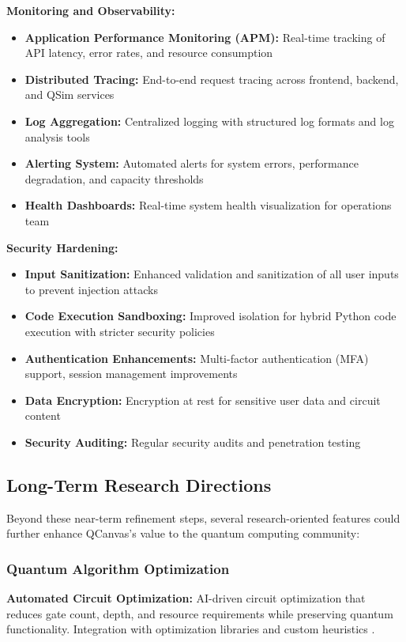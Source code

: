 \textbf{Monitoring and Observability:}
\begin{itemize}
    \item \textbf{Application Performance Monitoring (APM):} Real-time tracking of API latency, error rates, and resource consumption
    \item \textbf{Distributed Tracing:} End-to-end request tracing across frontend, backend, and QSim services
    \item \textbf{Log Aggregation:} Centralized logging with structured log formats and log analysis tools
    \item \textbf{Alerting System:} Automated alerts for system errors, performance degradation, and capacity thresholds
    \item \textbf{Health Dashboards:} Real-time system health visualization for operations team
\end{itemize}

\textbf{Security Hardening:}
\begin{itemize}
    \item \textbf{Input Sanitization:} Enhanced validation and sanitization of all user inputs to prevent injection attacks
    \item \textbf{Code Execution Sandboxing:} Improved isolation for hybrid Python code execution with stricter security policies
    \item \textbf{Authentication Enhancements:} Multi-factor authentication (MFA) support, session management improvements
    \item \textbf{Data Encryption:} Encryption at rest for sensitive user data and circuit content
    \item \textbf{Security Auditing:} Regular security audits and penetration testing
\end{itemize}

\subsection{Long-Term Research Directions}

Beyond these near-term refinement steps, several research-oriented features could further enhance QCanvas's value to the quantum computing community:

\subsubsection{Quantum Algorithm Optimization}

\textbf{Automated Circuit Optimization:} AI-driven circuit optimization that reduces gate count, depth, and resource requirements while preserving quantum functionality. Integration with optimization libraries and custom heuristics \cite{sivarajah2020tket}.

